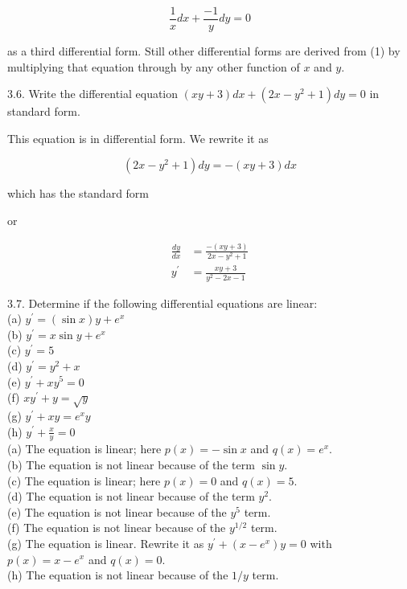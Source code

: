 \documentclass[10pt]{article}
\begin{document}
\begin{equation*}
\frac{1}{x} d x+\frac{-1}{y} d y=0 \tag{3}
\end{equation*}


as a third differential form. Still other differential forms are derived from (1) by multiplying that equation through by any other function of $x$ and $y$.

3.6. Write the differential equation $(x y+3) d x+\left(2 x-y^{2}+1\right) d y=0$ in standard form.

This equation is in differential form. We rewrite it as

$$
\left(2 x-y^{2}+1\right) d y=-(x y+3) d x
$$

which has the standard form

or

$$
\begin{aligned}
\frac{d y}{d x} & =\frac{-(x y+3)}{2 x-y^{2}+1} \\
y^{\prime} & =\frac{x y+3}{y^{2}-2 x-1}
\end{aligned}
$$

3.7. Determine if the following differential equations are linear:\\
(a) $y^{\prime}=(\sin x) y+e^{x}$\\
(b) $y^{\prime}=x \sin y+e^{x}$\\
(c) $y^{\prime}=5$\\
(d) $y^{\prime}=y^{2}+x$\\
(e) $y^{\prime}+x y^{5}=0$\\
(f) $x y^{\prime}+y=\sqrt{y}$\\
(g) $y^{\prime}+x y=e^{x} y$\\
(h) $y^{\prime}+\frac{x}{y}=0$\\
(a) The equation is linear; here $p(x)=-\sin x$ and $q(x)=e^{x}$.\\
(b) The equation is not linear because of the term $\sin y$.\\
(c) The equation is linear; here $p(x)=0$ and $q(x)=5$.\\
(d) The equation is not linear because of the term $y^{2}$.\\
(e) The equation is not linear because of the $y^{5}$ term.\\
(f) The equation is not linear because of the $y^{1 / 2}$ term.\\
(g) The equation is linear. Rewrite it as $y^{\prime}+\left(x-e^{x}\right) y=0$ with $p(x)=x-e^{x}$ and $q(x)=0$.\\
(h) The equation is not linear because of the $1 / y$ term.
\end{document}
